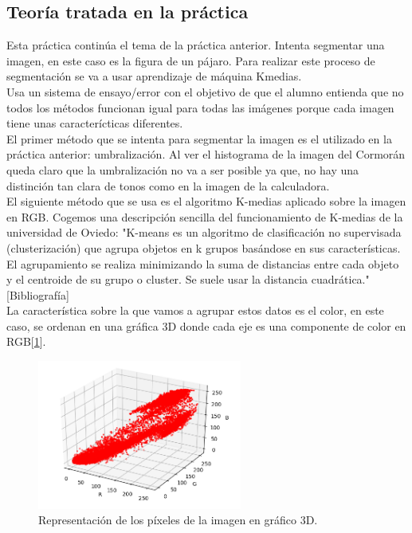 \documentclass[a4paper,12pt]{report}
\begin{document}
\subsection{Teoría tratada en la práctica}

Esta práctica continúa el tema de la práctica anterior. Intenta segmentar una imagen, en este caso es la figura de un pájaro. Para realizar este proceso de segmentación se va a usar aprendizaje de máquina Kmedias.\\

Usa un sistema de ensayo/error con el objetivo de que el alumno entienda que no todos los métodos funcionan igual para todas las imágenes porque cada imagen tiene unas caracterícticas diferentes.\\

El primer método que se intenta para segmentar la imagen es el utilizado en la práctica anterior: umbralización. Al ver el histograma de la imagen del Cormorán queda claro que la umbralización no va a ser posible ya que, no hay una distinción tan clara de tonos como en la imagen de la calculadora.\\

El siguiente método que se usa es el algoritmo K-medias aplicado sobre la imagen en RGB. Cogemos una descripción sencilla del funcionamiento de K-medias de la universidad de Oviedo: "K-means es un algoritmo de clasificación no supervisada (clusterización) que agrupa objetos en k grupos basándose en sus características. El agrupamiento se realiza minimizando la suma de distancias entre cada objeto y el centroide de su grupo o cluster. Se suele usar la distancia cuadrática."[Bibliografía]\\

La característica sobre la que vamos a agrupar estos datos es el color, en este caso, se ordenan en una gráfica 3D donde cada eje es una componente de color en RGB[\ref{cormoranrgb}].\\

\begin{figure}[h]
\centering
\includegraphics[width=0.6\textwidth]{imagenes/cormoranrgb}
\caption{Representación de los píxeles de la imagen en gráfico 3D.}
\label{cormoranrgb}
\end{figure}
\end{document}
